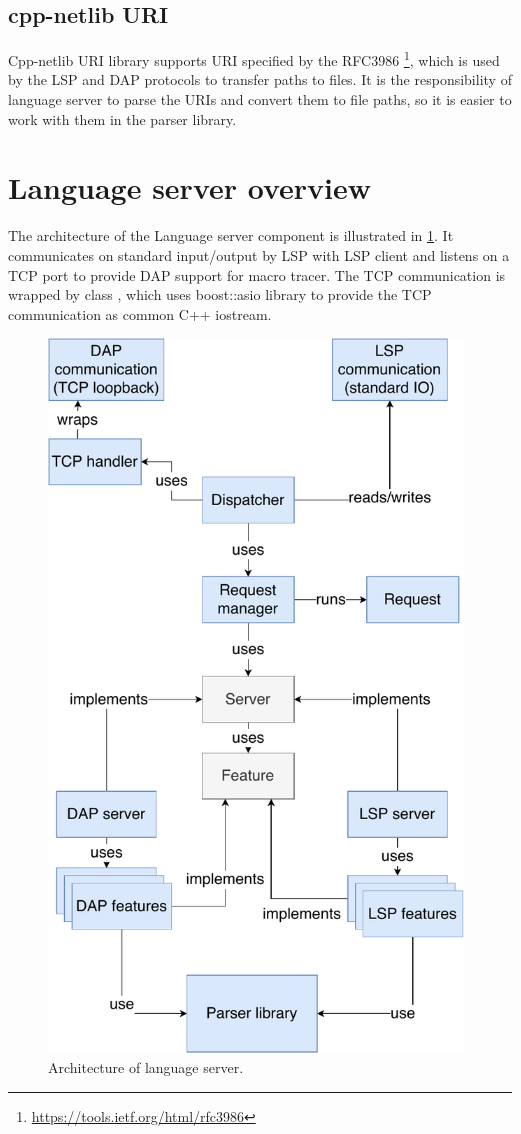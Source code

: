 \subsection{cpp-netlib URI}
Cpp-netlib URI library supports URI specified by the RFC3986 \footnote{\url{https://tools.ietf.org/html/rfc3986}}, which is used by the LSP and DAP protocols to transfer paths to files. It is the responsibility of language server to parse the URIs and convert them to file paths, so it is easier to work with them in the parser library. 

\section{Language server overview}
The architecture of the Language server component is illustrated in \cref{lang_server_arch}. It communicates on standard input/output by LSP with LSP client and listens on a TCP port to provide DAP support for macro tracer. The TCP communication is wrapped by class , which uses boost::asio library to provide the TCP communication as common C++ iostream.


\begin{figure}
	\centering
	\includegraphics[width=11cm]{img/lang_server}
	\caption{Architecture of language server.}
	\label{lang_server_arch}
\end{figure}


